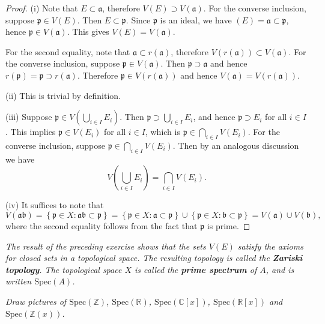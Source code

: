 \begin{proof}
(i) Note that $E\subset\mathfrak{a}$, therefore $V(E)\supset V(\mathfrak{a})$. For the converse inclusion, suppose $\mathfrak{p}\in V(E)$. Then $E\subset\mathfrak{p}$. Since $\mathfrak{p}$ is an ideal, we have $(E)=\mathfrak{a}\subset\mathfrak{p}$, hence $\mathfrak{p}\in V(\mathfrak{a})$. This gives $V(E)=V(\mathfrak{a})$.\par
For the second equality, note that $\mathfrak{a}\subset r(\mathfrak{a})$, therefore $V(r(\mathfrak{a}))\subset V(\mathfrak{a})$. For the converse inclusion, suppose $\mathfrak{p}\in V(\mathfrak{a})$. Then $\mathfrak{p}\supset\mathfrak{a}$ and hence $r(\mathfrak{p})=\mathfrak{p}\supset r(\mathfrak{a})$. Therefore $\mathfrak{p}\in V(r(\mathfrak{a}))$ and hence $V(\mathfrak{a})=V(r(\mathfrak{a}))$.\par
(ii) This is trivial by definition.\par
(iii) Suppose $\mathfrak{p}\in V\left(\bigcup_{i\in I}E_i\right)$. Then $\mathfrak{p}\supset\bigcup_{i\in I}E_i$, and hence $\mathfrak{p}\supset E_i$ for all $i\in I$. This implies $\mathfrak{p}\in V(E_i)$ for all $i\in I$, which is $\mathfrak{p}\in\bigcap_{i\in I}V(E_i)$. For the converse inclusion, suppose $\mathfrak{p}\in\bigcap_{i\in I}V(E_i)$. Then by an analogous discussion we have 
$$
V\left( \bigcup_{i\in I}{E_i} \right) =\bigcap_{i\in I}{V\left( E_i \right)}.
$$\par
(iv) It suffices to note that 
$$
V\left( \mathfrak{a} \mathfrak{b} \right) =\left\{ \mathfrak{p} \in X:\mathfrak{a} \mathfrak{b} \subset \mathfrak{p} \right\} =\left\{ \mathfrak{p} \in X:\mathfrak{a} \subset \mathfrak{p} \right\} \cup \left\{ \mathfrak{p} \in X:\mathfrak{b} \subset \mathfrak{p} \right\} =V\left( \mathfrak{a} \right) \cup V\left( \mathfrak{b} \right) ,
$$
where the second equality follows from the fact that $\mathfrak{p}$ is prime.
\end{proof}
\begin{note}\em
The result of the preceding exercise shows that the sets $V(E)$ satisfy the axioms for closed sets in a topological space. The resulting topology is called the \textbf{Zariski topology}. The topological space $X$ is called the \textbf{prime spectrum} of $A$, and is written $\mathrm{Spec}(A)$.
\end{note}
\begin{problem}\em
Draw pictures of $\mathrm{Spec}(\mathbb{Z})$, $\mathrm{Spec}(\mathbb{R})$, $\mathrm{Spec}(\mathbb{C}[x])$, $\mathrm{Spec}(\mathbb{R}[x])$ and $\mathrm{Spec}(\mathbb{Z}(x))$.
\end{problem}
